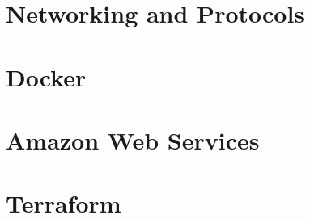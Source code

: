 \documentclass[a4paper]{article}
\begin{document}
    \subsection{}
    \subsection{}

    \newpage
    \section{Networking and Protocols}
    \subsection{}
    \subsection{}

    \newpage
    \section{Docker}
    \subsection{}
    \subsection{}
    
    \newpage
    \section{Amazon Web Services}
    \subsection{}
    \subsection{}
    
    \newpage
    \section{Terraform}
    \subsection{}
    \subsection{}
    
\end{document}
